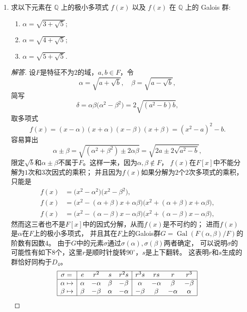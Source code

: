 \begin{enumerate}
\item 求以下元素在 $\mathbb{Q}$ 上的极小多项式 $f(x)$ 以及 $f(x)$ 在 $\mathbb{Q}$ 上的 Galois 群:
\begin{enumerate}[label=(\arabic*)]
    \item $\alpha = \sqrt{3 + \sqrt{5}}$;
    \item $\alpha = \sqrt{4 + \sqrt{5}}$;
    \item $\alpha = \sqrt{5 + \sqrt{5}}$.
\end{enumerate}
\begin{proof}[解答]
    设$F$是特征不为$2$的域，$a,b \in F$，令
    \[\alpha=\sqrt{a+\sqrt{b}},\quad\beta=\sqrt{a-\sqrt{b}},\]
    简写
    \[\delta=\alpha\beta\big(\alpha^2-\beta^2\big)=2\sqrt{(a^2-b)b},\]
    取多项式
    \[f(x)=(x-\alpha)(x+\alpha)(x-\beta)(x+\beta)=(x^2-a)^2-b.\]
    容易算出
    \[\alpha\pm\beta=\sqrt{(\alpha^2+\beta^2)\pm2\alpha\beta}
    =\sqrt{2a\pm2\sqrt{a^2-b}},\]
    限定$\sqrt{b}$和$\alpha\pm\beta$不属于$F$。这样一来，因为$\alpha,\beta \notin F$，
    $f(x)$在$F[x]$中不能分解为$1$次和$3$次因式的乘积；
    并且因为$f(x)$如果分解为$2$个$2$次多项式的乘积，只能是
    \begin{align*}
        f(x)&=\big(x^2-\alpha^2\big)\big(x^2-\beta^2\big),\\
        f(x)&=\big(x^2-(\alpha+\beta)x+\alpha\beta\big)\big(x^2+(\alpha+\beta)x+\alpha\beta\big),\\
        f(x)&=\big(x^2-(\alpha-\beta)x-\alpha\beta\big)\big(x^2+(\alpha-\beta)x-\alpha\beta\big),
    \end{align*}
    然而这三者也不是$F[x]$中的因式分解，从而$f(x)$是不可约的；
    进而$f(x)$是$\alpha$在$F$上的极小多项式，
    并且其在$F$上的Galois群$G=\operatorname{Gal}(F(\alpha,\beta)/F)$的阶数有因数$4$。
    由于$G$中的元素$\sigma$通过$\sigma(\alpha),\sigma(\beta)$两者确定，
    可以说明$\sigma$的可能性有如下$8$个，这里$r$是顺时针旋转$90^\circ$，$s$是上下翻转。
    这表明$r$和$s$生成的群恰好同构于$D_4$。
    $$\begin{array}{|c|cccc|cccc|}
    \hline \sigma=\, & e &r^2 & s & r^2s & r^3s & rs & r & r^3\\
    \hline \alpha\mapsto  & \alpha & -\alpha & \beta & -\beta & \alpha & -\alpha & \beta & -\beta\\
    \beta\mapsto & \beta & -\beta & \alpha & -\alpha & -\beta & \beta & -\alpha & \alpha\\
    \hline\end{array}$$
    \begin{tikzpicture}

\end{tikzpicture}
\end{proof}
\end{enumerate}
